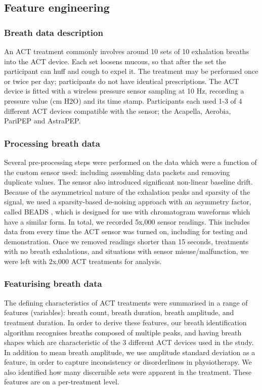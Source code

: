 \documentclass{article}
\begin{document}
\subsection{Feature engineering}
\subsubsection{Breath data description}
An ACT treatment commonly involves around 10 sets of 10 exhalation breaths into the ACT device. Each set loosens mucous, so that after the set the participant can huff and cough to expel it. The treatment may be performed once or twice per day; participants do not have identical prescriptions. The ACT device is fitted with a wireless pressure sensor sampling at 10 Hz, recording a pressure value (cm H2O) and its time stamp. Participants each used 1-3 of 4 different ACT devices compatible with the sensor; the Acapella, Aerobia, PariPEP and AstraPEP.  
\subsubsection{Processing breath data}
Several pre-processing steps were performed on the data which were a function of the custom sensor used: including assembling data packets and removing duplicate values. The sensor also introduced significant non-linear baseline drift. Because of the asymmetrical nature of the exhalation peaks and sparsity of the signal, we used a sparsity-based de-noising approach with an asymmetry factor, called BEADS \cite{Ning2014}, which is designed for use with chromatogram waveforms which have a similar form. 
In total, we recorded 5x,000 sensor readings. This includes data from every time the ACT sensor was turned on, including for testing and demonstration. Once we removed readings shorter than 15 seconds, treatments with no breath exhalations, and situations with sensor misuse/malfunction, we were left with 2x,000 ACT treatments for analysis. 

\subsubsection{Featurising breath data}
The defining characteristics of ACT treatments were summarised in a range of features (variables): breath count, breath duration, breath amplitude, and treatment duration. In order to derive these features, our breath identification algorithm recognises breaths composed of multiple peaks, and having breath shapes which are characteristic of the 3 different ACT devices used in the study. In addition to mean breath amplitude, we use amplitude standard deviation as a feature, in order to capture inconsistency or disorderliness in physiotherapy. We also identified how many discernible sets were apparent in the treatment. These features are on a per-treatment level. 
\end{document}
